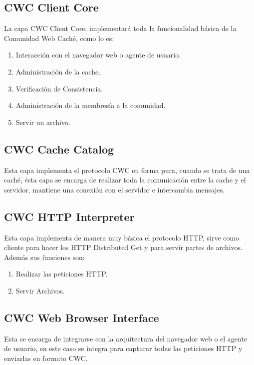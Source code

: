 \subsection{CWC Client Core}
La capa CWC Client Core, implementará toda la funcionalidad básica de la Comunidad Web Caché, como lo es:

\begin{enumerate}
\item Interacción con el navegador web o agente de usuario.
\item Administración de la cache.
\item Verificación de Consistencia.
\item Administración de la membresía a la comunidad.
\item Servir un archivo.
\end{enumerate}

\subsection{CWC Cache Catalog}
Esta capa implementa el protocolo CWC en forma pura, cuando se trata de una caché, ésta capa se encarga de realizar toda la comunicación entre la cache y el servidor, mantiene una conexión con el servidor e intercambia mensajes. 

\subsection{CWC HTTP Interpreter}
Esta capa implementa de manera muy básica el protocolo HTTP, sirve como cliente para hacer los HTTP Distributed Get y para servir partes de archivos. Además sus funciones son:
\begin{enumerate}
\item Realizar las peticiones HTTP.
\item Servir Archivos.
\end{enumerate}

\subsection{CWC Web Browser Interface}
Esta se encarga de integrarse con la arquitectura del navegador web o el agente de usuario, en este caso se integra para capturar todas las peticiones HTTP y enviarlas en formato CWC.